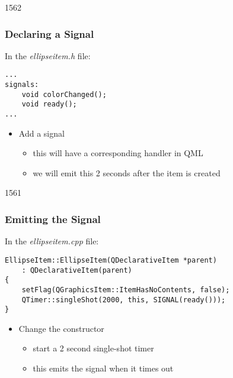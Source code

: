 \begin{slide}[fragile]{1562}\frametitle{Declaring a Signal}

In the \textit{ellipseitem.h} file:

\vspace*{0.5em}
\begin{lstlisting}
...
signals:
    void colorChanged();
    void ready();
...
\end{lstlisting}

\begin{itemize}
\item Add a  signal
  \begin{itemize}
  \item this will have a corresponding  handler in QML
  \item we will emit this 2 seconds after the item is created
  \end{itemize}
\end{itemize}

\end{slide}

\begin{slide}[fragile]{1561}\frametitle{Emitting the Signal}

In the \textit{ellipseitem.cpp} file:

\vspace*{0.5em}
\begin{lstlisting}
EllipseItem::EllipseItem(QDeclarativeItem *parent)
    : QDeclarativeItem(parent)
{
    setFlag(QGraphicsItem::ItemHasNoContents, false);
    QTimer::singleShot(2000, this, SIGNAL(ready()));
}
\end{lstlisting}

\begin{itemize}
\item Change the constructor
  \begin{itemize}
  \item start a 2 second single-shot timer
  \item this emits the  signal when it times out
  \end{itemize}
\end{itemize}

\end{slide}

